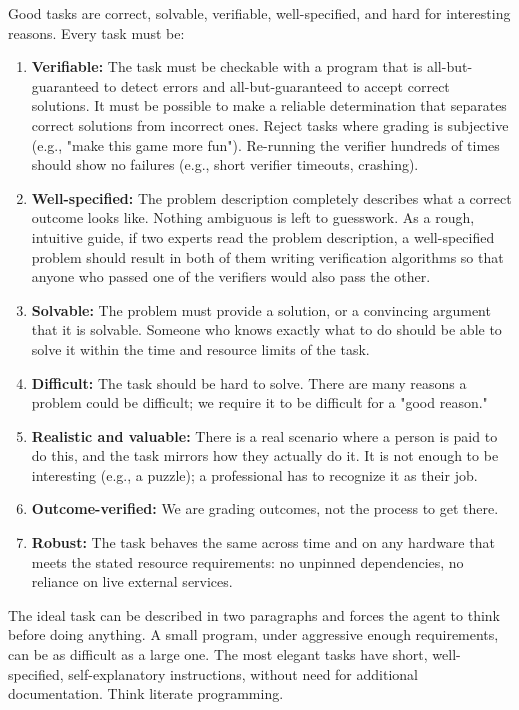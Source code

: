 \documentclass[11pt]{article}
\begin{document}
Good tasks are correct, solvable, verifiable, well-specified, and hard for interesting reasons. Every task must be:

\begin{enumerate}
    \item \textbf{Verifiable:} The task must be checkable with a program that is all-but-guaranteed to detect errors and all-but-guaranteed to accept correct solutions. It must be possible to make a reliable determination that separates correct solutions from incorrect ones. Reject tasks where grading is subjective (e.g., "make this game more fun"). Re-running the verifier hundreds of times should show no failures (e.g., short verifier timeouts, crashing).
    \item \textbf{Well-specified:} The problem description completely describes what a correct outcome looks like. Nothing ambiguous is left to guesswork. As a rough, intuitive guide, if two experts read the problem description, a well-specified problem should result in both of them writing verification algorithms so that anyone who passed one of the verifiers would also pass the other.
    \item \textbf{Solvable:} The problem must provide a solution, or a convincing argument that it is solvable. Someone who knows exactly what to do should be able to solve it within the time and resource limits of the task.
    \item \textbf{Difficult:} The task should be hard to solve. There are many reasons a problem could be difficult; we require it to be difficult for a "good reason."
    \item \textbf{Realistic and valuable:} There is a real scenario where a person is paid to do this, and the task mirrors how they actually do it. It is not enough to be interesting (e.g., a puzzle); a professional has to recognize it as their job.
    \item \textbf{Outcome-verified:} We are grading outcomes, not the process to get there.
    \item \textbf{Robust:} The task behaves the same across time and on any hardware that meets the stated resource requirements: no unpinned dependencies, no reliance on live external services.
\end{enumerate}

The ideal task can be described in two paragraphs and forces the agent to think before doing anything. A small program, under aggressive enough requirements, can be as difficult as a large one. The most elegant tasks have short, well-specified, self-explanatory instructions, without need for additional documentation. Think literate programming.
\end{document}
